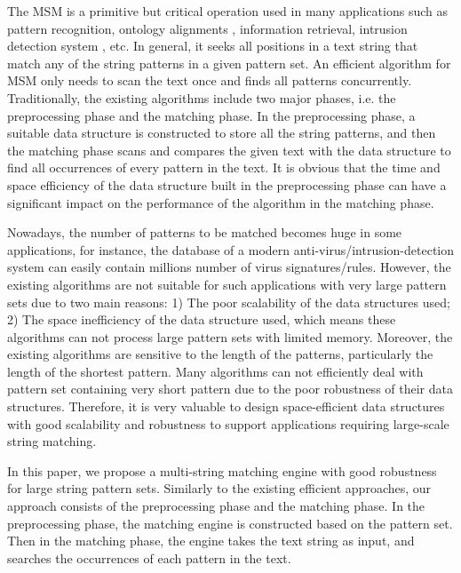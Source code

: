 The MSM is a primitive but critical operation used in many
applications such as pattern recognition, ontology alignments
\cite{Xue2015} \cite{Xue2016}, information retrieval, intrusion
detection system \cite{Kim2015}, etc. In general, it seeks all
positions in a text string that match any of the string patterns in a
given pattern set. An efficient algorithm for MSM only needs to scan
the text once and finds all patterns concurrently. Traditionally, the
existing algorithms include two major phases, i.e. the
\textsf{preprocessing phase} and the \textsf{matching phase}. In the
\textsf{preprocessing phase}, a suitable data structure is constructed
to store all the string patterns, and then the \textsf{matching phase}
scans and compares the given text with the data structure to find all
occurrences of every pattern in the text. It is obvious that the time
and space efficiency of the data structure built in the preprocessing
phase can have a significant impact on the performance of the
algorithm in the matching phase.

Nowadays, the number of patterns to be matched becomes huge in some
applications, for instance, the database of a modern
anti-virus/intrusion-detection system can easily contain millions
number of virus signatures/rules. However, the existing algorithms are
not suitable for such applications with very large pattern sets due to
two main reasons: 1) The poor scalability of the data structures used;
2) The space inefficiency of the data structure used, which means
these algorithms can not process large pattern sets with limited
memory. Moreover, the existing algorithms are sensitive to the length
of the patterns, particularly the length of the shortest pattern. Many
algorithms can not efficiently deal with pattern set containing very
short pattern due to the poor robustness of their data
structures. Therefore, it is very valuable to design space-efficient
data structures with good scalability and robustness to support
applications requiring large-scale string matching.

In this paper, we propose a multi-string matching engine with good
robustness for large string pattern sets. Similarly to the existing
efficient approaches, our approach consists of the preprocessing phase
and the matching phase. In the preprocessing phase, the matching
engine is constructed based on the pattern set. Then in the matching
phase, the engine takes the text string as input, and searches the
occurrences of each pattern in the text.

